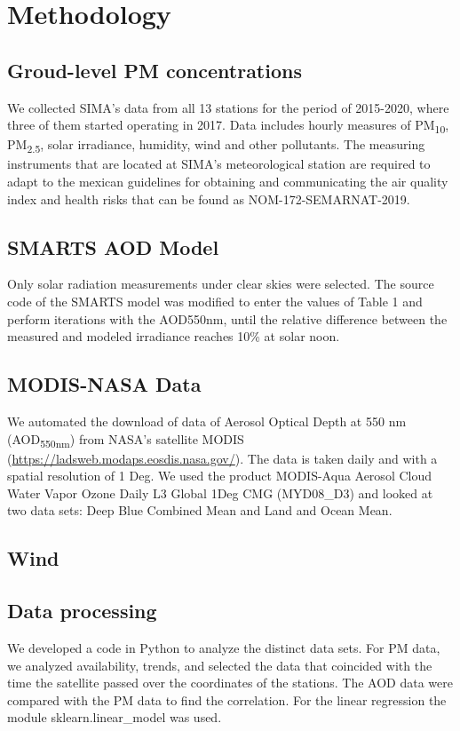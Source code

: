 \section{Methodology}
\subsection{Groud-level PM concentrations}
We collected SIMA’s data from all 13 stations for the period of 2015-2020, where three of them
started operating in 2017. Data includes hourly measures of PM\textsubscript{10}, PM\textsubscript{2.5},
solar irradiance, humidity, wind and other pollutants. The measuring instruments that are located at SIMA’s
meteorological station are required to adapt to the mexican guidelines for obtaining and communicating the
air quality index and health risks that can be found as NOM-172-SEMARNAT-2019.

\subsection{SMARTS AOD Model}
Only solar radiation measurements under clear skies were selected. The source code of the SMARTS model was
modified to enter the values of Table 1 and perform iterations with the AOD550nm, until the relative difference
between the measured and modeled irradiance reaches 10\% at solar noon.
\subsection{MODIS-NASA Data}
We automated the download of data of Aerosol Optical Depth at 550 nm (AOD\textsubscript{550nm}) from NASA’s
satellite MODIS (\url{https://ladsweb.modaps.eosdis.nasa.gov/}). The data is taken daily and with a spatial
resolution of 1 Deg. We used the product MODIS-Aqua Aerosol Cloud Water Vapor Ozone Daily L3 Global 1Deg CMG
(MYD08\_D3) and looked at two data sets: Deep Blue Combined Mean and Land and Ocean Mean. 
\subsection{Wind}
\subsection{Data processing}
We developed a code in Python to analyze the distinct data sets. For PM data, we analyzed availability,
trends, and selected the data that coincided with the time the satellite passed over the coordinates of
the stations. The AOD data were compared with the PM data to find the correlation. For the linear regression
the module sklearn.linear\_model was used.